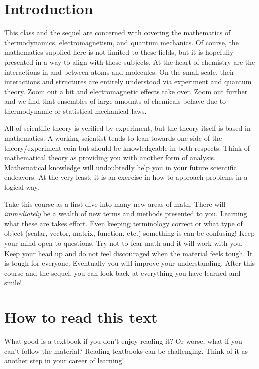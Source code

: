     \section{Introduction}
    
    This class and the sequel are concerned with covering the mathematics of thermodynamics, electromagnetism, and quantum mechanics. Of course, the mathematics supplied here is not limited to these fields, but it is hopefully presented in a way to align with those subjects.  At the heart of chemistry are the interactions in and between atoms and molecules. On the small scale, their interactions and structures are entirely understood via experiment and quantum theory. Zoom out a bit and electromagnetic effects take over. Zoom out further and we find that ensembles of large amounts of chemicals behave due to thermodynamic or statistical mechanical laws.  
    
    All of scientific theory is verified by experiment, but the theory itself is based in mathematics. A working scientist tends to lean towards one side of the theory/experiment coin but should be knowledgeable in both respects.  Think of mathematical theory as providing you with another form of analysis.  Mathematical knowledge will undoubtedly help you in your future scientific endeavors.  At the very least, it is an exercise in how to approach problems in a logical way.
    
    Take this course as a first dive into many new areas of math.  There will \emph{immediately} be a wealth of new terms and methods presented to you.  Learning what these are takes effort.  Even keeping terminology correct or what type of object (scalar, vector, matrix, function, etc.) something is can be confusing! Keep your mind open to questions.  Try not to fear math and it will work with you. Keep your head up and do not feel discouraged when the material feels tough.  It is tough for everyone.  Eventually you will improve your understanding. After this course and the sequel, you can look back at everything you have learned and smile!
    
    
    \section{How to read this text}
    
    What good is a textbook if you don't enjoy reading it? Or worse, what if you can't follow the material? Reading textbooks can be challenging. Think of it as another step in your career of learning!
    
